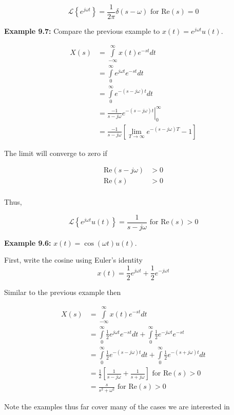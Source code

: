 \documentclass{article}
\begin{document}
\[
\mathcal{L}\left\{e^{j\omega t}\right\} = \frac{1}{2\pi} \delta(s - \omega) \text{ for Re}(s) = 0 
\]


\textbf{Example 9.7:} Compare the previous example to $x(t) = e^{j\omega t}u(t)$.

\begin{align}
  X(s) &= \int\limits_{-\infty}^{\infty} x(t) e^{-st} dt\\
  &= \int\limits_{0}^{\infty} e^{j\omega t} e^{-st} dt\\
  &= \int\limits_{0}^{\infty} e^{-(s-j\omega)t} dt\\
  &= \frac{-1}{s-j\omega} \left. e^{-(s-j\omega)t} \right|_{0}^{\infty}\\
  &= \frac{-1}{s-j\omega} \left[ \lim_{T\rightarrow \infty} e^{-(s-j\omega)T} -  1 \right]
\end{align}

The limit will converge to zero if

\begin{align}
  \text{Re}(s-j\omega) &> 0\\
  \text{Re}(s) &> 0\\
\end{align}

Thus,

\[
\mathcal{L}\left\{e^{j\omega t}u(t)\right\} = \frac{1}{s-j\omega} \text{ for Re}(s) > 0 
\]

\textbf{Example 9.6:} $x(t) = \cos(\omega t)u(t)$.

First, write the cosine using Euler's identity
\[
x(t) = \frac{1}{2}e^{j\omega t} + \frac{1}{2}e^{-j\omega t} 
\]

Similar to the previous example then

\begin{align}
  X(s) &= \int\limits_{-\infty}^{\infty} x(t) e^{-st} dt\\
  &= \int\limits_{0}^{\infty} \frac{1}{2}e^{j\omega t} e^{-st} dt + \int\limits_{0}^{\infty} \frac{1}{2}e^{-j\omega t} e^{-st}\\
  &= \int\limits_{0}^{\infty} \frac{1}{2}e^{-(s-j\omega)t} dt + \int\limits_{0}^{\infty} \frac{1}{2}e^{-(s+j\omega)t} dt\\
  &= \frac{1}{2} \left[ \frac{1}{s-j\omega} + \frac{1}{s+j\omega}\right] \text{ for Re}(s) > 0\\
  &= \frac{s}{s^2 + \omega^2} \text{ for Re}(s) > 0 
\end{align}

Note the examples thus far cover many of the cases we are interested in
\end{document}
